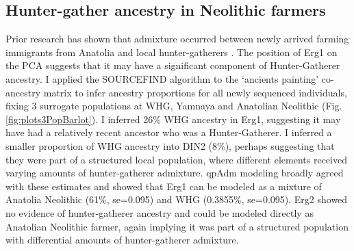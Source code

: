 \subsection{Hunter-gather ancestry in Neolithic farmers}

Prior research has shown that admixture occurred between newly arrived farming immigrants from Anatolia and local hunter-gatherers \cite{Gamba2014, Lipson2017b}. The position of Erg1 on the PCA suggests that it may have a significant component of Hunter-Gatherer ancestry. I applied the SOURCEFIND algorithm to the `ancients painting' co-ancestry matrix to infer ancestry proportions for all newly sequenced individuals, fixing 3 surrogate populations at WHG, Yamnaya and Anatolian Neolithic (Fig. \ref{fig:plots3PopBarlot}). I inferred 26\% WHG ancestry in Erg1, suggesting it may have had a relatively recent ancestor who was a Hunter-Gatherer. I inferred a smaller proportion of WHG ancestry into DIN2 (8\%), perhaps suggesting that they were part of a structured local population, where different elements received varying amounts of hunter-gatherer admixture. qpAdm modeling broadly agreed with these estimates and showed that Erg1 can be modeled as a mixture of Anatolia Neolithic (61\%, se=0.095) and WHG (0.3855\%, se=0.095). Erg2 showed no evidence of hunter-gatherer ancestry and could be modeled directly as Anatolian Neolithic farmer, again implying it was part of a structured population with differential amounts of hunter-gatherer admixture. 

